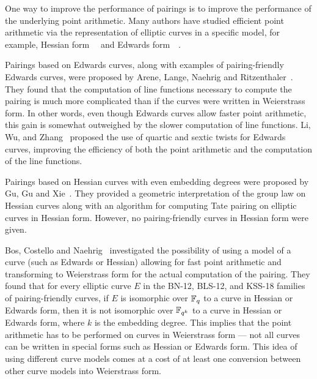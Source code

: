One way to improve the performance of pairings is
to improve the performance of the underlying point arithmetic.
Many authors have studied efficient point arithmetic via the 
representation of elliptic curves in a specific model,
for example, Hessian form~\cite{2001/smart}~\cite{2001/joye} and
Edwards form~\cite{2007/edwards}~\cite{2007/bernstein-newelliptic}.

Pairings based on Edwards curves,
along with examples of pairing-friendly Edwards curves,
were proposed by Arene, Lange, Naehrig and Ritzenthaler~\cite{2009/fastertate}.
They found that the computation of line functions necessary to compute the pairing
is much more complicated than if the curves were written in Weierstrass form.
In other words,
even though Edwards curves allow faster point arithmetic,
this gain is somewhat outweighed by the slower computation of line functions.
Li, Wu, and Zhang~\cite{2014/LWZ} proposed the use of quartic and sextic twists
for Edwards curves, improving the efficiency of both the point arithmetic and
the computation of the line functions.

Pairings based on Hessian curves with even embedding degrees were proposed by Gu, Gu and Xie~\cite{2010/Gu}.
They provided a geometric interpretation of the group law on Hessian curves
along with an algorithm for computing Tate pairing on elliptic curves in Hessian form.
However, no pairing-friendly curves in Hessian form were given.

Bos, Costello and Naehrig~\cite{2013/bos-pairing} investigated the possibility of
using a model of a curve (such as Edwards or Hessian) allowing for fast point arithmetic
and transforming to Weierstrass form for the actual computation of the pairing.
They found that for every elliptic curve $E$ in the BN-12, BLS-12, and KSS-18 families of pairing-friendly curves,
if $E$ is isomorphic over $\mathbb{F}_{q}$ to a curve in Hessian or Edwards form,
then it is not isomorphic over $\mathbb{F}_{q^{k}}$ to a curve in Hessian or Edwards form,
where $k$ is the embedding degree.
This implies that the point arithmetic has to be performed on curves in Weierstrass form --- not all curves can be written in special forms such as Hessian or Edwards form.
This idea of using different curve models comes at a cost of at least one conversion
between other curve models into Weierstrass form.

